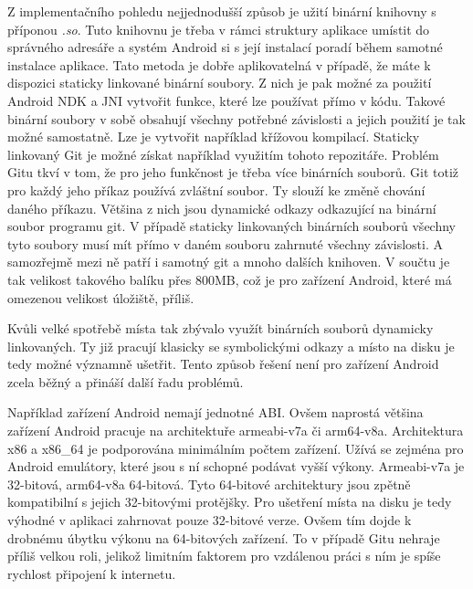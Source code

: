         Z implementačního pohledu nejjednodušší způsob je užití binární knihovny s příponou \emph{.so}. Tuto knihovnu je třeba v rámci struktury aplikace umístit do správného adresáře a systém Android si s její instalací poradí během samotné instalace aplikace. Tato metoda je dobře aplikovatelná v případě, že máte k dispozici staticky linkované binární soubory. Z nich je pak možné za použití Android NDK a JNI vytvořit funkce, které lze používat přímo v kódu. Takové binární soubory v sobě obsahují všechny potřebné závislosti a jejich použití je tak možné samostatně. Lze je vytvořit například křížovou kompilací. Staticky linkovaný Git je možné získat například využitím tohoto repozitáře. Problém Gitu tkví v tom, že pro jeho funkčnost je třeba více binárních souborů. Git totiž pro každý jeho příkaz používá zvláštní soubor. Ty slouží ke změně chování daného příkazu. Většina z nich jsou dynamické odkazy odkazující na binární soubor programu git. V případě staticky linkovaných binárních souborů všechny tyto soubory musí mít přímo v daném souboru zahrnuté všechny závislosti. A samozřejmě mezi ně patří i samotný git a mnoho dalších knihoven. V součtu je tak velikost takového balíku přes 800MB, což je pro zařízení Android, které má omezenou velikost úložiště, příliš.

        Kvůli velké spotřebě místa tak zbývalo využít binárních souborů dynamicky linkovaných. Ty již pracují klasicky se symbolickými odkazy a místo na disku je tedy možné významně ušetřit. Tento způsob řešení není pro zařízení Android zcela běžný a přináší další řadu problémů.

        Například zařízení Android nemají jednotné ABI. Ovšem naprostá většina zařízení Android pracuje na architektuře armeabi-v7a či arm64-v8a. Architektura x86 a x86\_64 je podporována minimálním počtem zařízení. Užívá se zejména pro Android emulátory, které jsou s ní schopné podávat vyšší výkony. Armeabi-v7a je 32-bitová, arm64-v8a 64-bitová. Tyto 64-bitové architektury jsou zpětně kompatibilní s jejich 32-bitovými protějšky. Pro ušetření místa na disku je tedy výhodné v aplikaci zahrnovat pouze 32-bitové verze. Ovšem tím dojde k drobnému úbytku výkonu na 64-bitových zařízení. To v případě Gitu nehraje příliš velkou roli, jelikož limitním faktorem pro vzdálenou práci s ním je spíše rychlost připojení k internetu.

